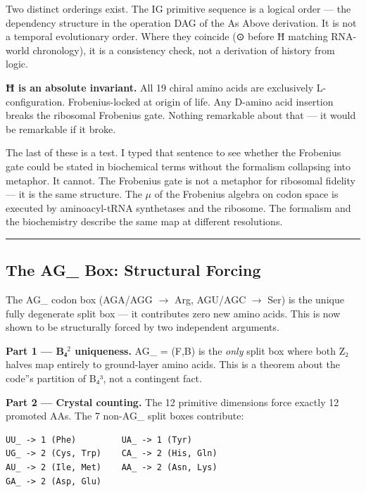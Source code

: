 \documentclass[12pt,a4paper]{article}
\begin{document}
Two distinct orderings exist. The IG primitive sequence is a logical order --- the dependency structure in the operation DAG of the As Above derivation. It is not a temporal evolutionary order. Where they coincide (⊙ before Ħ matching RNA-world chronology), it is a consistency check, not a derivation of history from logic.

\textbf{Ħ is an absolute invariant.} All 19 chiral amino acids are exclusively L-configuration. Frobenius-locked at origin of life. Any D-amino acid insertion breaks the ribosomal Frobenius gate. Nothing remarkable about that --- it would be remarkable if it broke.

The last of these is a test. I typed that sentence to see whether the Frobenius gate could be stated in biochemical terms without the formalism collapsing into metaphor. It cannot. The Frobenius gate is not a metaphor for ribosomal fidelity --- it is the same structure. The $\mu$ of the Frobenius algebra on codon space is executed by aminoacyl-tRNA synthetases and the ribosome. The formalism and the biochemistry describe the same map at different resolutions.

\begin{center}
\rule{0.5\textwidth}{0.4pt}
\end{center}

\subsection{The AG\_ Box: Structural Forcing}

The AG\_ codon box (AGA/AGG $\rightarrow$ Arg, AGU/AGC $\rightarrow$ Ser) is the unique fully degenerate split box --- it contributes zero new amino acids. This is now shown to be structurally forced by two independent arguments.

\textbf{Part 1 --- B₄$^{2}$ uniqueness.} AG\_ = (F,B) is the \emph{only} split box where both Z₂ halves map entirely to ground-layer amino acids. This is a theorem about the code''s partition of B₄³, not a contingent fact.

\textbf{Part 2 --- Crystal counting.} The 12 primitive dimensions force exactly 12 promoted AAs. The 7 non-AG\_ split boxes contribute:

\begin{lstlisting}
UU_ -> 1 (Phe)         UA_ -> 1 (Tyr)
UG_ -> 2 (Cys, Trp)    CA_ -> 2 (His, Gln)
AU_ -> 2 (Ile, Met)    AA_ -> 2 (Asn, Lys)
GA_ -> 2 (Asp, Glu)
\end{lstlisting}
\end{document}
